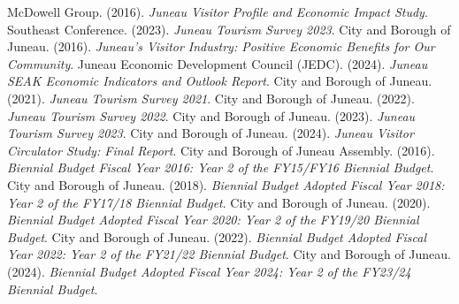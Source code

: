 
\begin{thebibliography}{99}
   McDowell Group. (2016). \textit{ Juneau Visitor Profile and Economic Impact Study}. 
   Southeast Conference. (2023).  \textit{Juneau Tourism Survey 2023}. 
   City and Borough of Juneau. (2016).  \textit{Juneau’s Visitor Industry: Positive Economic Benefits for Our Community}. 
   Juneau Economic Development Council (JEDC). (2024).  \textit{Juneau SEAK Economic Indicators and Outlook Report}. 
   City and Borough of Juneau. (2021).  \textit{Juneau Tourism Survey 2021}. 
   City and Borough of Juneau. (2022).  \textit{Juneau Tourism Survey 2022}. 
   City and Borough of Juneau. (2023).  \textit{Juneau Tourism Survey 2023}. 
   City and Borough of Juneau. (2024).  \textit{Juneau Visitor Circulator Study: Final Report}. 
   City and Borough of Juneau Assembly. (2016).  \textit{Biennial Budget Fiscal Year 2016: Year 2 of the FY15/FY16 Biennial Budget}. 
   City and Borough of Juneau. (2018).  \textit{Biennial Budget Adopted Fiscal Year 2018: Year 2 of the FY17/18 Biennial Budget}. 
   City and Borough of Juneau. (2020).  \textit{Biennial Budget Adopted Fiscal Year 2020: Year 2 of the FY19/20 Biennial Budget}. 
   City and Borough of Juneau. (2022).  \textit{Biennial Budget Adopted Fiscal Year 2022: Year 2 of the FY21/22 Biennial Budget}. 
   City and Borough of Juneau. (2024).  \textit{Biennial Budget Adopted Fiscal Year 2024: Year 2 of the FY23/24 Biennial Budget}. 
\end{thebibliography}
